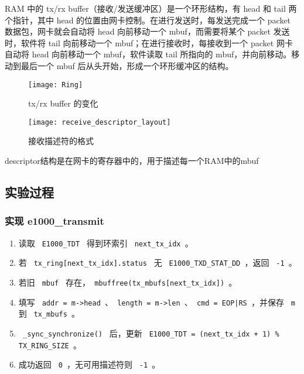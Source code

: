 RAM 中的 tx/rx buffer（接收/发送缓冲区）是一个环形结构，有 head 和 tail 两个指针，其中 head 的位置由网卡控制。在进行发送时，每发送完成一个 packet 数据包，网卡就会自动将 head 向前移动一个 mbuf，而需要将某个 packet 发送时，软件将 tail 向前移动一个 mbuf；在进行接收时，每接收到一个 packet 网卡自动将 head 向前移动一个 mbuf，软件读取 tail 所指向的 mbuf，并向前移动。移动到最后一个 mbuf 后从头开始，形成一个环形缓冲区的结构。

\begin{figure}[!htb]
	\centering
	\texttt{[image: Ring]}
	\caption{tx/rx buffer 的变化}
	\label{fig:Ring}
\end{figure}

\begin{figure}[!htb]
	\centering
	\texttt{[image: receive\_descriptor\_layout]}
	\caption{接收描述符的格式}
	\label{fig:receive_descriptor_layout}
\end{figure}

descriptor结构是在网卡的寄存器中的，用于描述每一个RAM中的mbuf

\subsection{实验过程}

\subsubsection{实现 e1000\_transmit}

\begin{enumerate}
	\item 读取 \texttt{ E1000\_TDT } 得到环索引 \texttt{ next\_tx\_idx }。
	\item 若 \texttt{ tx\_ring[next\_tx\_idx].status } 无 \texttt{ E1000\_TXD\_STAT\_DD }，返回 \texttt{ -1 }。
	\item 若旧 \texttt{ mbuf } 存在，\texttt{ mbuffree(tx\_mbufs[next\_tx\_idx]) }。
	\item 填写 \texttt{ addr = m->head }、\texttt{ length = m->len }、\texttt{ cmd = EOP|RS }，并保存 \texttt{ m } 到 \texttt{ tx\_mbufs }。
	\item \texttt{ \_sync\_synchronize() } 后，更新 \texttt{ E1000\_TDT = (next\_tx\_idx + 1) \% TX\_RING\_SIZE }。
	\item 成功返回 \texttt{ 0 }，无可用描述符则 \texttt{ -1 }。
\end{enumerate}

